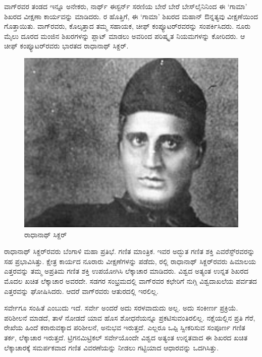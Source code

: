 \vskip 4pt

ವಾಗ್​ರವರ ತಂಡದ ಇನ್ನೂ ಅನೇಕರು, ನಾರ್ಥ್ ಈಸ್ಟರ್ನ್ ಸರಣಿಯ ಬೇರೆ ಬೇರೆ ಬೇಸ್‌ಲೈನಿನಿಂದ ಈ ‘ಗಾಮಾ’ ಶಿಖರದ ವೀಕ್ಷಣಾ ಕಾರ್ಯವನ್ನು ಮಾಡಿದರು. ರ ಹೊತ್ತಿಗೆ, ಈ ‘ಗಾಮಾ’ ಶಿಖರದ ಮಹಾನ್​ ಔನ್ನತ್ಯವು ವೀಕ್ಷಣೆಯಿಂದ ಗೊತ್ತಾಯಿತು. ವಾಗ್​ರವರು, ಕೊಲ್ಕತ್ತಾದ ತಮ್ಮ ಸಹಾಯಕ, ಚೀಫ್​ ಕಂಪ್ಯೂಟರ್​ರವರನ್ನು ಸಂಪರ್ಕಿಸಿದರು. ನೂರು ಮೈಲು ದೂರದ ಮಂಜಿನ ಶಿಖರಗಳನ್ನು ಪ್ಲಾಟ್​ ಮಾಡಲು ಅವರಿಂದ ಪರಿಷ್ಕೃತ ನಿಯಮಗಳನ್ನು ಕೋರಿದರು. ಆ ಚೀಫ್​ ಕಂಪ್ಯೂಟರ್​ರವರು ಭಾರತದ ರಾಧಾನಾಥ್​ ಸಿಕ್ದರ್​.

\begin{figure}[!hbtp]
\includegraphics[scale=1.2]{"images/image019.jpg"}
\caption{ರಾಧಾನಾಥ್​ ಸಿಕ್ದರ್​}\label{chap15-fig2}
\end{figure}

ರಾಧಾನಾಥ್​ ಸಿಕ್ದರ್​ರವರು ಬೆಂಗಾಳಿ ಮಹಾ ಪ್ರತಿಭೆ. ಗಣಿತ ಮಾಂತ್ರಿಕ. ಇವರ ಅದ್ಭುತ ಗಣಿತ ಶಕ್ತಿ ಎವರೆಸ್ಟ್​ರವರನ್ನು ಸಹ ಪ್ರಭಾವಿಸಿತ್ತು. ಕ್ಷೇತ್ರ ಕಾರ್ಯದ ನೂರಾರು ವೀಕ್ಷಣೆಗಳನ್ನು ಪಡೆದು, ರಲ್ಲಿ ರಾಧಾನಾಥ್​ ಸಿಕ್ದರ್​ರವರು ಹಿಮಾಲಯ ಎತ್ತರವನ್ನು ತಮ್ಮ ಅಪ್ರತಿಮ ಗಣಿತ ಶಕ್ತಿ ಉಪಯೋಗಿಸಿ ಲೆಕ್ಕಾಚಾರ ಮಾಡಿದರು. ವಿಶ್ವದ ಅತ್ಯಂತ ಉನ್ನತ ಶಿಖರದ ಮೊದಲ ಖಚಿತ ಲೆಕ್ಕಾಚಾರ ಅವರದೇ. ಸಡಗರ ಸಂಭ್ರಮದಲ್ಲಿ ವಾಗ್​ರವರ ಕಛೇರಿಗೆ ನುಗ್ಗಿ ವಿಶ್ವದಾಖಲೆಯ ಪರ್ವತದ ಎತ್ತರವನ್ನು ಘೋಷಿಸಿದರು. ಆದರೆ ವಾಗ್​ರವರು ಆತುರದಲ್ಲಿ ಇರಲಿಲ್ಲ.

 ಸರ್ವೇಗೂ ಸಂಹಿತೆ ಎಂಬುದು ಇದೆ. ಸರ್ವೇ ಅಂದರೆ ಅದು ಸರಳವಾದುದು ಅಲ್ಲ. ಅದು ಸಂಕೀರ್ಣ ಪ್ರಕ್ರಿಯೆ. ಪರಿಶೀಲನೆ ಮಾಡದೆ, ತಾಳೆ ನೋಡದೆ ಯಾವ ಹೊಸ ಶೋಧನೆಯನ್ನೂ ಪ್ರಕಟಿಸುವಂತಿರಲಿಲ್ಲ. ನಕ್ಷೆಯಲ್ಲಿನ ಪ್ರತಿ ಗೆರೆ, ರೇಖೆಯ ಹಿಂದೆ ಕರಾರುವಕ್ಕಾದ ಪರಿಶೀಲನೆ, ಅನುಭವ ಇರುತ್ತದೆ. ಎಲ್ಲರೂ ಒಪ್ಪಿ ಸ್ವೀಕರಿಸುವ ಸಂಪೂರ್ಣ ಗಣಿತ ತರ್ಕ, ಲೆಕ್ಕಾಚಾರ ಇರುತ್ತದೆ. ಟ್ರಿಗನಮಿಟ್ರಿಕಲ್​ ಸರ್ವೇಯೊಂದೇ ವಿಶ್ವದ ಅತ್ಯಂತ ಉನ್ನತವಾದ ಈ ಶಿಖರದ ಖಚಿತ ಲೆಕ್ಕಾಚಾರಕ್ಕೆ ಸಮರ್ಪಕವಾದ ಗಣಿತ ವಿವರಣೆಯನ್ನು ನೀಡಲು ಗಟ್ಟಿಯಾದ ಆಧಾರವನ್ನು ಒದಗಿಸಿತ್ತು.

